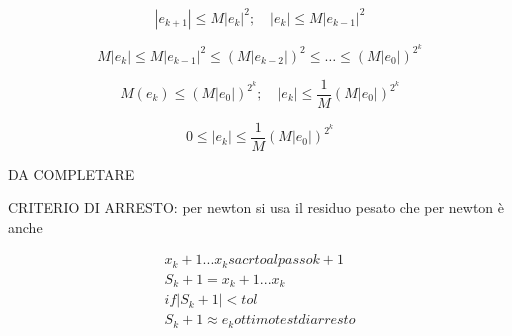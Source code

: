 \documentclass[a4paper, 11pt]{article}
\begin{document}
        \[
        |e_{k+1}| \leq M |e_k|^2; \quad |e_k| \leq M |e_{k-1}|^2
        \]

        \[
        M|e_k| \leq M |e_{k-1}|^2 \leq (M|e_{k-2}|)^2 \leq \ldots \leq (M|e_0|)^{2^k}
        \]

        \[
        M(e_k) \leq (M|e_0|)^{2^k}; \quad |e_k| \leq \frac{1}{M}(M |e_0|)^{2^k}
        \]

        \[
        0 \leq |e_k| \leq \frac{1}{M} (M |e_0|)^{2^k}
        \]

        DA COMPLETARE 
 
 

        CRITERIO DI ARRESTO:
        per newton si usa il residuo pesato che per newton è anche

        \begin{align*}
            x_k+1 ... x_k sacrto al passo k+1\\
            S_k+1 = x_k+1 ... x_k \\
            if |S_k+1 | < tol \\
            S_k+1 \approx e_k ottimo test di arresto 
        \end{align*}
        
       

 
 
\end{document}
